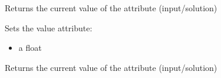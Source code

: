 \documentclass[letterpaper,10pt,english]{sphinxmanual}
\begin{document}
\begin{fulllineitems}

\begin{fulllineitems}
\label{\detokenize{modules_doc:cbmpy.CBModel.Parameter.getValue}}
\pysigstartsignatures
{}
\pysigstopsignatures
\sphinxAtStartPar
Returns the current value of the attribute (input/solution)

\end{fulllineitems}


\begin{fulllineitems}
\label{\detokenize{modules_doc:cbmpy.CBModel.Parameter.setValue}}
\pysigstartsignatures
{}
\pysigstopsignatures
\sphinxAtStartPar
Sets the value attribute:
\begin{itemize}
\item {} 
\sphinxAtStartPar
{} a float

\end{itemize}

\end{fulllineitems}


\begin{fulllineitems}
\label{\detokenize{modules_doc:cbmpy.CBModel.Parameter.value}}
\pysigstartsignatures
{}
\pysigstopsignatures
\sphinxAtStartPar
Returns the current value of the attribute (input/solution)

\end{fulllineitems}


\end{fulllineitems}

\end{document}
